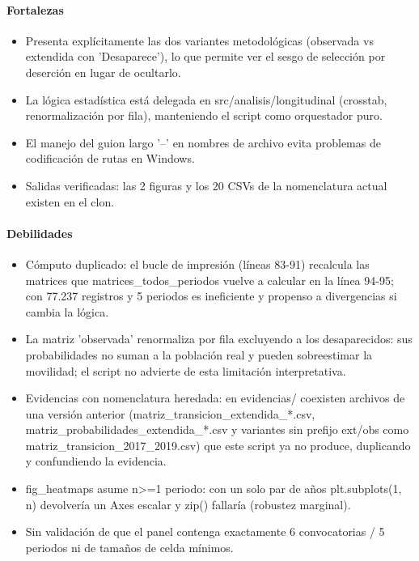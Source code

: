 \paragraph{Fortalezas}
\begin{itemize}
  \item Presenta explícitamente las dos variantes metodológicas (observada vs extendida con 'Desaparece'), lo que permite ver el sesgo de selección por deserción en lugar de ocultarlo.
  \item La lógica estadística está delegada en src/analisis/longitudinal (crosstab, renormalización por fila), manteniendo el script como orquestador puro.
  \item El manejo del guion largo '--' en nombres de archivo evita problemas de codificación de rutas en Windows.
  \item Salidas verificadas: las 2 figuras y los 20 CSVs de la nomenclatura actual existen en el clon.
\end{itemize}

\paragraph{Debilidades}
\begin{itemize}
  \item Cómputo duplicado: el bucle de impresión (líneas 83-91) recalcula las matrices que matrices\_todos\_periodos vuelve a calcular en la línea 94-95; con 77.237 registros y 5 periodos es ineficiente y propenso a divergencias si cambia la lógica.
  \item La matriz 'observada' renormaliza por fila excluyendo a los desaparecidos: sus probabilidades no suman a la población real y pueden sobreestimar la movilidad; el script no advierte de esta limitación interpretativa.
  \item Evidencias con nomenclatura heredada: en evidencias/ coexisten archivos de una versión anterior (matriz\_transicion\_extendida\_*.csv, matriz\_probabilidades\_extendida\_*.csv y variantes sin prefijo ext/obs como matriz\_transicion\_2017\_2019.csv) que este script ya no produce, duplicando y confundiendo la evidencia.
  \item fig\_heatmaps asume n>=1 periodo: con un solo par de años plt.subplots(1, n) devolvería un Axes escalar y zip() fallaría (robustez marginal).
  \item Sin validación de que el panel contenga exactamente 6 convocatorias / 5 periodos ni de tamaños de celda mínimos.
\end{itemize}

